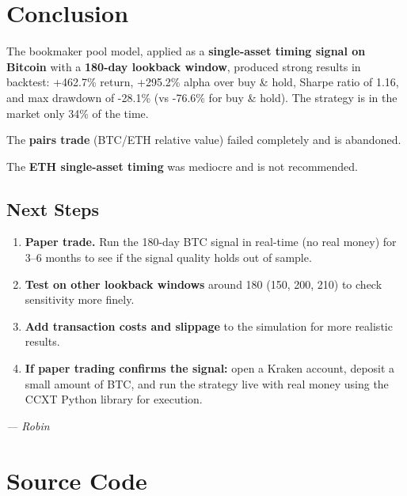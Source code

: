 \documentclass[11pt,a4paper]{article}
\begin{document}

\section{Conclusion}

The bookmaker pool model, applied as a \textbf{single-asset timing
signal on Bitcoin} with a \textbf{180-day lookback window}, produced
strong results in backtest: +462.7\% return, +295.2\% alpha over buy
\& hold, Sharpe ratio of 1.16, and max drawdown of -28.1\% (vs -76.6\%
for buy \& hold). The strategy is in the market only 34\% of the time.

The \textbf{pairs trade} (BTC/ETH relative value) failed completely
and is abandoned.

The \textbf{ETH single-asset timing} was mediocre and is not
recommended.

\subsection{Next Steps}

\begin{enumerate}[leftmargin=2em]
    \item \textbf{Paper trade.} Run the 180-day BTC signal in
          real-time (no real money) for 3--6 months to see if the
          signal quality holds out of sample.
    \item \textbf{Test on other lookback windows} around 180
          (150, 200, 210) to check sensitivity more finely.
    \item \textbf{Add transaction costs and slippage} to the
          simulation for more realistic results.
    \item \textbf{If paper trading confirms the signal:} open a
          Kraken account, deposit a small amount of BTC, and run
          the strategy live with real money using the CCXT Python
          library for execution.
\end{enumerate}

\vspace{2em}
\begin{center}
\textit{--- Robin}
\end{center}

\newpage
\appendix

\section{Source Code}
\end{document}
